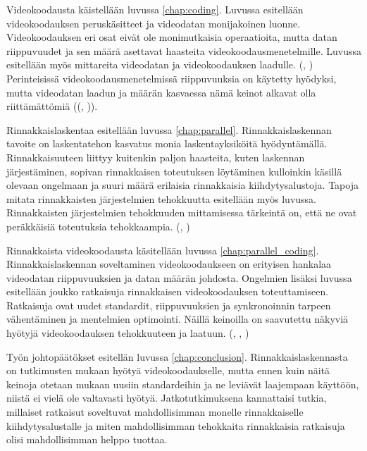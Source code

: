 Videokoodausta käistellään luvussa \ref{chap:coding}. Luvussa esitellään
videokoodauksen peruskäsitteet ja videodatan monijakoinen luonne.
Videokoodauksen eri osat eivät ole monimutkaisia operaatioita, mutta datan
riippuvuudet ja sen määrä asettavat haasteita videokoodausmenetelmille. Luvussa
esitellään myös mittareita videodatan ja videokoodauksen laadulle. (\citealt{h264}, \citealt{du})
Perinteisissä videokoodausmenetelmissä riippuvuuksia on käytetty hyödyksi,
mutta videodatan laadun ja määrän kasvaessa nämä keinot alkavat olla
riittämättömiä ((\citealt{chi}, \citealt{xu})).

Rinnakkaislaskentaa esitellään luvussa \ref{chap:parallel}. Rinnakkaislaskennan
tavoite on laskentatehon kasvatus monia laskentayksiköitä hyödyntämällä.
Rinnakkaisuuteen liittyy kuitenkin paljon haasteita, kuten laskennan
järjestäminen, sopivan rinnakkaisen toteutuksen löytäminen kulloinkin käsillä
olevaan ongelmaan ja suuri määrä erilaisia rinnakkaisia kiihdytysalustoja.
Tapoja mitata rinnakkaisten järjestelmien tehokkuutta esitellään myös luvussa.
Rinnakkaisten järjestelmien tehokkuuden mittamisessa tärkeintä on, että ne ovat
peräkkäisiä toteutuksia tehokkaampia. (\citealt{intro}, \citealt{rauber})

Rinnakkaista videokoodausta käsitellään luvussa \ref{chap:parallel_coding}.
Rinnakkaislaskennan soveltaminen videokoodaukseen on erityisen hankalaa
videodatan riippuvuuksien ja datan määrän johdosta. Ongelmien lisäksi
luvussa esitellään joukko ratkaisuja rinnakkaisen videokoodauksen
toteuttamiseen. Ratkaisuja ovat uudet standardit, riippuvuuksien ja
synkronoinnin tarpeen vähentäminen ja mentelmien optimointi. Näillä keinoilla
on saavutettu näkyviä hyötyjä videokoodauksen tehokkuuteen ja laatuun.
(\citealt{pieters}, \citealt{chi}, \citealt{xu})

Työn johtopäätökset esitellän luvussa \ref{chap:conclusion}.
Rinnakkaislaskennasta on tutkimusten mukaan hyötyä videokoodaukselle, mutta
ennen kuin näitä keinoja otetaan mukaan uusiin standardeihin ja ne leviävät
laajempaan käyttöön, niistä ei vielä ole valtavasti hyötyä. Jatkotutkimuksena
kannattaisi tutkia, millaiset ratkaisut soveltuvat mahdollisimman monelle
rinnakkaiselle kiihdytysalustalle ja miten mahdollisimman tehokkaita
rinnakkaisia ratkaisuja olisi mahdollisimman helppo tuottaa.


